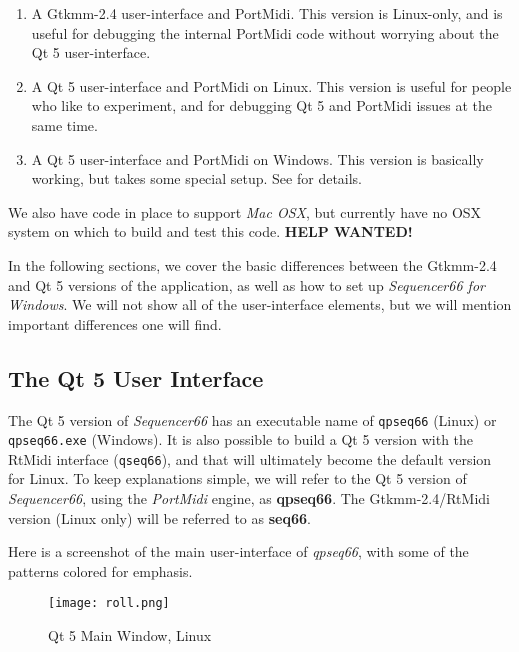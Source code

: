    \begin{enumerate}
      \item A Gtkmm-2.4 user-interface and PortMidi.  This version is
         Linux-only, and is useful for debugging the internal PortMidi code
         without worrying about the Qt 5 user-interface.
      \item A Qt 5 user-interface and PortMidi on Linux.  This version is
         useful for people who like to experiment, and for debugging Qt 5 and
         PortMidi issues at the same time.
      \item A Qt 5 user-interface and PortMidi on Windows.  This version is
         basically working, but takes some special setup.
         See  for details.
   \end{enumerate}

   We also have code in place to support
   \textsl{Mac OSX},
   but currently have no OSX system on which to build and test this
   code.  \textbf{HELP WANTED!}

   In the following sections, we cover the basic differences between the
   Gtkmm-2.4 and Qt 5 versions of the application, as well as how to set up
   \textsl{Sequencer66 for Windows}.
   We will not show all of the user-interface elements, but we will mention
   important differences one will find.

\subsection{The Qt 5 User Interface}
\label{subsec:qt_portmidi_qt5_user_interface}

   The Qt 5 version of \textsl{Sequencer66} has an executable name of
   \texttt{qpseq66} (Linux) or \texttt{qpseq66.exe} (Windows).
   It is also possible to build a Qt 5 version with the RtMidi interface
   (\texttt{qseq66}), and
   that will ultimately become the default version for Linux.
   To keep explanations simple, we will refer to the Qt 5 version of
   \textsl{Sequencer66}, using the \textsl{PortMidi} engine,
   as \textbf{qpseq66}.
   The Gtkmm-2.4/RtMidi version (Linux only) will be referred to as
   \textbf{seq66}.

   Here is a screenshot of the main user-interface of \textsl{qpseq66}, with
   some of the patterns colored for emphasis.

\begin{figure}[H]
   \centering 
   \texttt{[image: roll.png]}
   \caption{Qt 5 Main Window, Linux}
   \label{fig:qt5_main_window_linux}
\end{figure}

